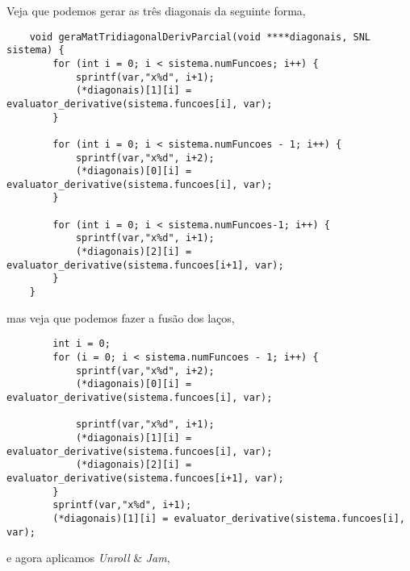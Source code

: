 \documentclass[10pt,a4paper]{article}
\begin{document}
	Veja que podemos gerar as três diagonais da seguinte forma, 
	\begin{lstlisting}
	void geraMatTridiagonalDerivParcial(void ****diagonais, SNL sistema) {
  		for (int i = 0; i < sistema.numFuncoes; i++) {
			sprintf(var,"x%d", i+1);
			(*diagonais)[1][i] = evaluator_derivative(sistema.funcoes[i], var);
		}
		
		for (int i = 0; i < sistema.numFuncoes - 1; i++) {
			sprintf(var,"x%d", i+2);
			(*diagonais)[0][i] = evaluator_derivative(sistema.funcoes[i], var);
		}
		
		for (int i = 0; i < sistema.numFuncoes-1; i++) {
			sprintf(var,"x%d", i+1);
			(*diagonais)[2][i] = evaluator_derivative(sistema.funcoes[i+1], var);
		}
	}
	\end{lstlisting}
	mas veja que podemos fazer a fusão dos laços, 
	\begin{lstlisting}
        int i = 0;
	    for (i = 0; i < sistema.numFuncoes - 1; i++) {
		    sprintf(var,"x%d", i+2);
		    (*diagonais)[0][i] = evaluator_derivative(sistema.funcoes[i], var);
		    
		    sprintf(var,"x%d", i+1);
		    (*diagonais)[1][i] = evaluator_derivative(sistema.funcoes[i], var);
		    (*diagonais)[2][i] = evaluator_derivative(sistema.funcoes[i+1], var);
	    }
	    sprintf(var,"x%d", i+1);
	    (*diagonais)[1][i] = evaluator_derivative(sistema.funcoes[i], var);
	\end{lstlisting}
	e agora aplicamos \textit{Unroll} \& \textit{Jam},
\end{document}
